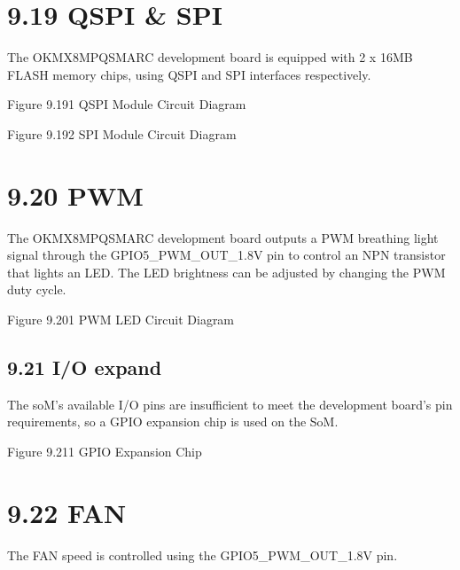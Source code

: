 \documentclass[letterpaper,10pt,openany,english]{sphinxmanual}
\begin{document}
\section{9.19 QSPI \& SPI}
\label{\detokenize{hardware:qspi-spi}}
\sphinxAtStartPar
The OK\sphinxhyphen{}MX8MPQ\sphinxhyphen{}SMARC development board is equipped with 2 x 16MB FLASH memory chips, using QSPI and SPI interfaces respectively.

\sphinxAtStartPar
{}

\sphinxAtStartPar
Figure 9.19\sphinxhyphen{}1 QSPI Module Circuit Diagram

\sphinxAtStartPar
{}

\sphinxAtStartPar
Figure 9.19\sphinxhyphen{}2 SPI Module Circuit Diagram


\section{9.20 PWM}
\label{\detokenize{hardware:id31}}
\sphinxAtStartPar
The OK\sphinxhyphen{}MX8MPQ\sphinxhyphen{}SMARC development board outputs a PWM breathing light signal through the GPIO5\_PWM\_OUT\_1.8V pin to control an NPN transistor that lights an LED. The LED brightness can be adjusted by changing the PWM duty cycle.

\sphinxAtStartPar
{}

\sphinxAtStartPar
Figure 9.20\sphinxhyphen{}1 PWM LED Circuit Diagram


\subsection{9.21 I/O expand}
\label{\detokenize{hardware:i-o-expand}}
\sphinxAtStartPar
The soM’s available I/O pins are insufficient to meet the development board’s pin requirements, so a GPIO expansion chip is used on the SoM.

\sphinxAtStartPar
{}

\sphinxAtStartPar
Figure 9.21\sphinxhyphen{}1 GPIO Expansion Chip


\section{9.22 FAN}
\label{\detokenize{hardware:fan}}
\sphinxAtStartPar
The FAN speed is controlled using the GPIO5\_PWM\_OUT\_1.8V pin.
\end{document}
